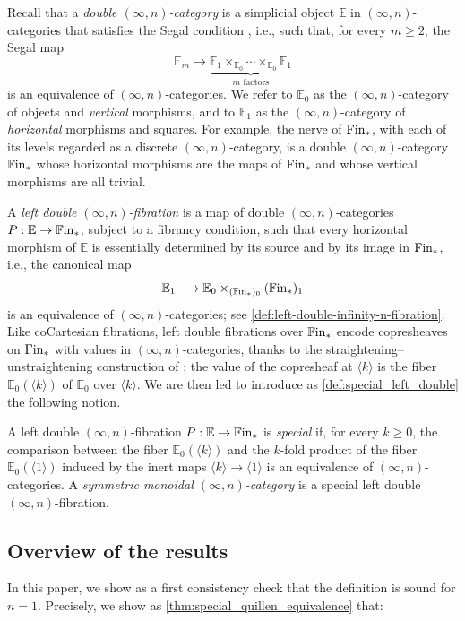 \documentclass[10pt,reqno]{amsart}
\begin{document}
Recall that a \emph{double $(\infty,n)$-category} is a simplicial
object $\mathbb E$ in $(\infty,n)$-categories that satisfies the
Segal condition \cite{Moser2026InftyN}, i.e., such that, for every
$m\geq2$, the Segal map
\[
\mathbb E_m\longrightarrow
\underbrace{\mathbb E_1\times_{\mathbb E_0}\cdots
\times_{\mathbb E_0}\mathbb E_1}_{m\text{ factors}}
\]
is an equivalence of $(\infty,n)$-categories. We refer to
$\mathbb E_0$ as the $(\infty,n)$-category of objects and
\emph{vertical} morphisms, and to $\mathbb E_1$ as the
$(\infty,n)$-category of \emph{horizontal} morphisms and squares. For
example, the nerve of $\mathrm{Fin}_*$, with each of its levels regarded as a
discrete $(\infty,n)$-category, is a double $(\infty,n)$-category
$\mathbb{F}\mathrm{in}_*$ whose horizontal morphisms are the maps of $\mathrm{Fin}_*$ and
whose vertical morphisms are all trivial.

A \emph{left double $(\infty,n)$-fibration} is a map of double
$(\infty,n)$-categories $P:\mathbb E\to\mathbb{F}\mathrm{in}_*$, subject to a
fibrancy condition, such that every horizontal morphism of
$\mathbb E$ is essentially determined by its source and by its image
in $\mathrm{Fin}_*$, i.e., the canonical map
\[
\mathbb E_1\longrightarrow
\mathbb E_0\times_{(\mathbb{F}\mathrm{in}_*)_0}(\mathbb{F}\mathrm{in}_*)_1
\]
is an equivalence of $(\infty,n)$-categories; see
\cref{def:left-double-infinity-n-fibration}. Like coCartesian
fibrations, left double fibrations over $\mathbb{F}\mathrm{in}_*$ encode
copresheaves on $\mathrm{Fin}_*$ with values in $(\infty,n)$-categories,
thanks to the straightening--unstraightening construction of
\cite{moser2023inftyncategoricalstraighteningunstraighteningconstruction};
the value of the copresheaf at $\langle k\rangle$ is the fiber
$\mathbb E_0(\langle k\rangle)$ of $\mathbb E_0$ over
$\langle k\rangle$. We are then led to introduce as
\cref{def:special_left_double} the following notion.

\begin{unnumberedtheoremdefinition}
A left double $(\infty,n)$-fibration $P:\mathbb E\to\mathbb{F}\mathrm{in}_*$ is
\emph{special} if, for every $k\geq0$, the comparison between the
fiber $\mathbb E_0(\langle k\rangle)$ and the $k$-fold product of
the fiber $\mathbb E_0(\langle1\rangle)$ induced by the inert maps
$\langle k\rangle\to\langle1\rangle$ is an equivalence of
$(\infty,n)$-categories. A \emph{symmetric monoidal
$(\infty,n)$-category} is a special left double
$(\infty,n)$-fibration.
\end{unnumberedtheoremdefinition}

\subsection*{Overview of the results}
In this paper, we show as a first consistency check that the
definition is sound for $n=1$. Precisely, we show as
\cref{thm:special_quillen_equivalence} that:
\end{document}
